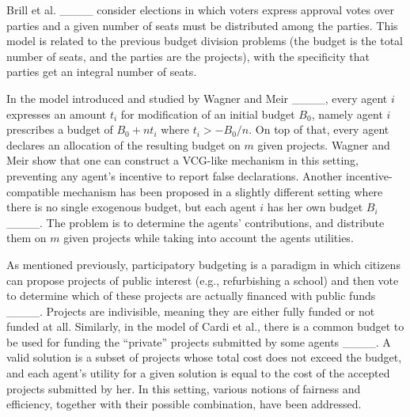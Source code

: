 Brill et al. ____ consider elections in which voters express approval votes over parties and a given number of seats must be distributed among the parties. This model is related to the previous budget division problems (the budget is the total number of seats, and the parties are the projects), with the specificity that parties get an integral number of seats. 





In the model introduced and studied by Wagner and Meir ____, every agent $i$ expresses an amount $t_i$ for modification of an initial budget $B_0$, namely agent $i$ prescribes a budget of $B_0+n t_i$ where $t_i >-B_0/n$. On top of that, every agent declares an allocation of the resulting budget on $m$ given projects. Wagner and Meir show that one can construct a VCG-like mechanism in this setting, preventing any agent's incentive to report false declarations. Another incentive-compatible mechanism has been proposed in a slightly different setting where there is no single exogenous budget, but each agent $i$ has her own budget $B_i$ ____. The problem is to determine the agents’ contributions, and %
distribute them on $m$ given projects while taking into account the agents utilities. 



As mentioned previously, participatory budgeting is a %
paradigm in which citizens can propose projects of public interest (e.g., refurbishing a school) and then vote to determine which of these projects are actually financed with public funds ____. Projects are indivisible, meaning they are either fully funded or not funded at all. Similarly, in the model of Cardi et al., there is a common budget to be used for funding the ``private'' projects submitted by some agents  ____. A valid solution is a subset of projects whose total cost does not exceed the budget, and each agent's utility for a given solution is equal to the cost of the accepted projects submitted by her. In this setting, various notions of fairness and efficiency, together with their possible combination, have been addressed. 





